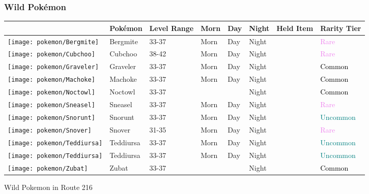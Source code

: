 \subsubsection{Wild Pokémon}%
\label{ssubsec:WildPokmon}%
\begin{longtable}{||l l l l l l l l||}%
\hline%
&Pokémon&Level Range&Morn&Day&Night&Held Item&Rarity Tier\\%
\hline%
\endhead%
\hline%
\texttt{[image: pokemon/Bergmite]}&Bergmite&33{-}37&Morn&Day&Night&&\textcolor{violet}{%
Rare%
}\\%
\hline%
\texttt{[image: pokemon/Cubchoo]}&Cubchoo&38{-}42&Morn&Day&Night&&\textcolor{violet}{%
Rare%
}\\%
\hline%
\texttt{[image: pokemon/Graveler]}&Graveler&33{-}37&Morn&Day&Night&&\textcolor{black}{%
Common%
}\\%
\hline%
\texttt{[image: pokemon/Machoke]}&Machoke&33{-}37&Morn&Day&Night&&\textcolor{black}{%
Common%
}\\%
\hline%
\texttt{[image: pokemon/Noctowl]}&Noctowl&33{-}37&&&Night&&\textcolor{black}{%
Common%
}\\%
\hline%
\texttt{[image: pokemon/Sneasel]}&Sneasel&33{-}37&Morn&Day&Night&&\textcolor{violet}{%
Rare%
}\\%
\hline%
\texttt{[image: pokemon/Snorunt]}&Snorunt&33{-}37&Morn&Day&Night&&\textcolor{teal}{%
Uncommon%
}\\%
\hline%
\texttt{[image: pokemon/Snover]}&Snover&31{-}35&Morn&Day&Night&&\textcolor{violet}{%
Rare%
}\\%
\hline%
\texttt{[image: pokemon/Teddiursa]}&Teddiursa&33{-}37&Morn&Day&Night&&\textcolor{teal}{%
Uncommon%
}\\%
\hline%
\texttt{[image: pokemon/Teddiursa]}&Teddiursa&33{-}37&Morn&Day&Night&&\textcolor{teal}{%
Uncommon%
}\\%
\hline%
\texttt{[image: pokemon/Zubat]}&Zubat&33{-}37&&&Night&&\textcolor{black}{%
Common%
}\\%
\hline%
\end{longtable}%
\caption{Wild Pokemon in Route 216}